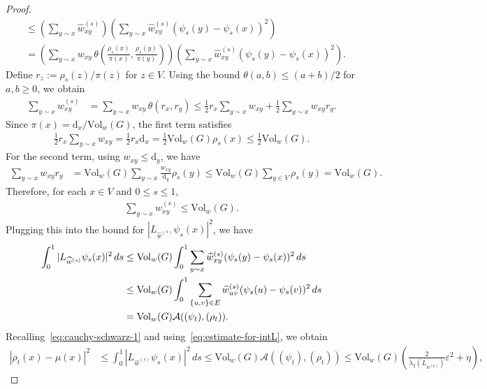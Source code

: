 \documentclass[10pt,a4paper]{amsart}
\newcommand{\Deg}{\mathrm{d}}
\newcommand{\Vol}{\mathrm{Vol}}
\begin{document}
\begin{proof}
\begin{align*}
            &\leq  \left(\sum_{y\sim x} \widehat{w}^{(s)}_{xy} \right)\left(\sum_{y\sim x} \widehat{w}^{(s)}_{xy} (\psi_s(y) - \psi_s(x))^2 \right)\\
            &= \left(\sum_{y\sim x} w_{xy}\, \theta\left(\frac{\rho_s(x)}{\pi(x)}, \frac{\rho_s(y)}{\pi(y)}\right) \right)\left(\sum_{y\sim x} \widehat{w}^{(s)}_{xy} (\psi_s(y) - \psi_s(x))^2 \right).
        \end{align*}
    Define $r_z := \rho_s(z)/\pi(z)$ for $z\in V$. Using the bound $\theta(a,b)\le (a+b)/2$ for $a,b\ge 0$, we obtain
        \begin{align*}
            \sum_{y\sim x}\widehat{w}^{(s)}_{xy}
            &= \sum_{y\sim x} w_{xy}\,\theta(r_x,r_y)
            \le \frac{1}{2}r_x\sum_{y\sim x}w_{xy} + \frac{1}{2}\sum_{y\sim x}w_{xy}r_y.
        \end{align*}
    Since $\pi(x)=\Deg_x/\Vol_w(G)$, the first term satisfies
        \begin{align*}
            \frac{1}{2}r_x\sum_{y\sim x}w_{xy} = \frac{1}{2}r_x\Deg_x=\frac{1}{2}\Vol_w(G)\rho_s(x) \le \frac{1}{2}\Vol_w(G).
        \end{align*}
    For the second term, using $w_{xy}\le \Deg_y$, we have
        \begin{align*}
            \sum_{y\sim x}w_{xy}r_y
            &= \Vol_w(G)\sum_{y\sim x}\frac{w_{xy}}{\Deg_y}\rho_s(y)
            \le \Vol_w(G)\sum_{y\in V}\rho_s(y)=\Vol_w(G).
        \end{align*}
    Therefore, for each $x\in V$ and $0\le s\le 1$,
        \begin{align*}
            \sum_{y\sim x}\widehat{w}^{(s)}_{xy} \le \Vol_w(G).
        \end{align*}
    Plugging this into the bound for $|L_{\widehat{w}^{(s)}} \psi_s(x)|^2$, we have
        \begin{align}\label{eq:estimate-for-intL}
            \int_0^1 |L_{\widehat{w}^{(s)}} \psi_s(x)|^2\,ds &\leq \Vol_w(G)\int_0^1 \sum_{y\sim x} \widehat{w}^{(s)}_{xy} (\psi_s(y) - \psi_s(x))^2\,ds\notag\\
            &\leq \Vol_w(G)\int_0^1 \sum_{\{u,v\}\in E} \widehat{w}^{(s)}_{uv} (\psi_s(u) - \psi_s(v))^2\,ds\notag\\
            &= \Vol_w(G)\mathcal{A}((\psi_t), (\rho_t)).
        \end{align}
    Recalling~\cref{eq:cauchy-schwarz-1} and using~\cref{eq:estimate-for-intL}, we obtain
        \begin{align*}
            |\rho_t(x) - \mu(x)|^2 &\leq \int_0^1 |L_{\widehat{w}^{(s)}} \psi_s(x)|^2 \, ds \leq \Vol_w(G) \mathcal{A}((\psi_t), (\rho_t)) \leq \Vol_w(G)\left(\frac{2}{\lambda_2(L_{w^{(\mu)}})}\varepsilon^2 + \eta\right),

\end{align*}
\end{proof}
\end{document}
